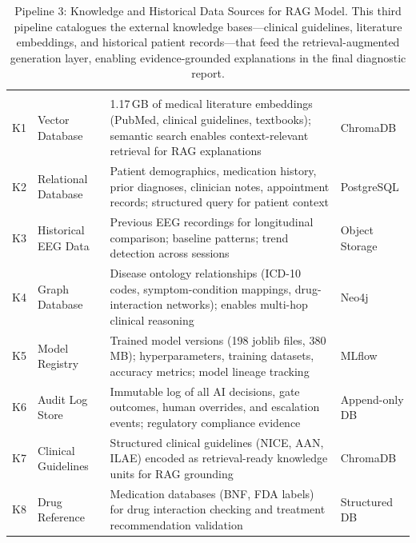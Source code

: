 {\tablestripes\tablefontsize
\begin{xltabular}{\textwidth}{@{} >{\raggedright\arraybackslash}p{0.5cm} >{\raggedright\arraybackslash}p{2.3cm} L >{\raggedright\arraybackslash}p{2cm} @{}}
\caption[Pipeline 3: Knowledge and Historical Data Sources for]{Pipeline 3: Knowledge and Historical Data Sources for RAG Model. This third pipeline catalogues the external knowledge bases---clinical guidelines, literature embeddings, and historical patient records---that feed the retrieval-augmented generation layer, enabling evidence-grounded explanations in the final diagnostic report.}\label{tab:knowledge_pipeline} \\
\toprule
\thead{\#} &  &  &  \\
\midrule
\endfirsthead
\toprule
\thead{\#} &  &  &  \\
\midrule
\endhead
\bottomrule
\endlastfoot
K1 & Vector Database & 1.17\,GB of medical literature embeddings (PubMed, clinical guidelines, textbooks); semantic search enables context-relevant retrieval for RAG explanations & ChromaDB \\
\addlinespace
K2 & Relational Database & Patient demographics, medication history, prior diagnoses, clinician notes, appointment records; structured query for patient context & PostgreSQL \\
\addlinespace
K3 & Historical EEG Data & Previous EEG recordings for longitudinal comparison; baseline patterns; trend detection across sessions & Object Storage \\
\addlinespace
K4 & Graph Database & Disease ontology relationships (ICD-10 codes, symptom-condition mappings, drug-interaction networks); enables multi-hop clinical reasoning & Neo4j \\
\addlinespace
K5 & Model Registry & Trained model versions (198 joblib files, 380\,MB); hyperparameters, training datasets, accuracy metrics; model lineage tracking & MLflow \\
\addlinespace
K6 & Audit Log Store & Immutable log of all AI decisions, gate outcomes, human overrides, and escalation events; regulatory compliance evidence & Append-only DB \\
\addlinespace
K7 & Clinical Guidelines & Structured clinical guidelines (NICE, AAN, ILAE) encoded as retrieval-ready knowledge units for RAG grounding & ChromaDB \\
\addlinespace
K8 & Drug Reference & Medication databases (BNF, FDA labels) for drug interaction checking and treatment recommendation validation & Structured DB \\
\end{xltabular}}

